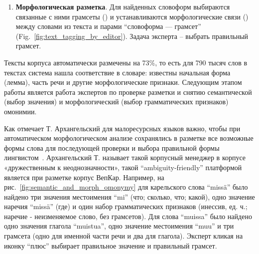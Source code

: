 \begin{enumerate}
\item \textbf{Морфологическая разметка}. 
Для найденных словоформ выбираются связанные с ними грамсеты  () и устанавливаются морфологические связи () между словами из текста и парами ``словоформа — грамсет'' (Fig.~\ref{fig:text_tagging_by_editor}). 
Задача эксперта -- выбрать правильный грамсет.


\end{enumerate}

Тексты корпуса автоматически размечены на 73\%, то есть для 790 тысяч слов в текстах система нашла соответствие в словаре: известны начальная форма (лемма), часть речи и другие морфологические признаки. Следующим этапом работы является работа экспертов по проверке разметки и снятию семантической (выбор значения) и морфологический (выбор грамматических признаков) омонимии.


Как отмечает Т. Архангельский для малоресурсных языков важно, чтобы при автоматическом морфологическом анализе сохранялись в разметке все возможные формы слова для последующей проверки и выбора правильной формы лингвистом~\cite[61]{Arkhangelskiy2020}. Архангельский Т. называет такой корпусный менеджер в корпусе «дружественным к неоднозначности», такой “ambiguity-friendly” платформой является при разметке корпус ВепКар.
Например, на рис.~\ref{fig:semantic_and_morph_omonymy} для карельского слова “missä” было найдено три значения местоимения “mi” (что; сколько, что; какой), одно значение наречия “missä” (где) и один набор грамматических признаков (инессив, ед. ч.; наречие - неизменяемое слово, без грамсетов). Для слова “muissa” было найдено одно значения глагола “muistua”, одно значение местоимения “muu” и три грамсета (одно для именной части речи и два для глагола). Эксперт кликая на иконку “плюс” выбирает правильное значение и правильный грамсет.

